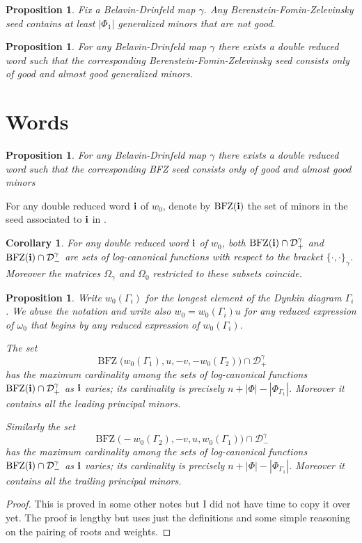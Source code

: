 \documentclass[a4paper]{amsart}
\newtheorem{proposition}[theorem]{Proposition}
\newtheorem{corollary}[theorem]{Corollary}
\theoremstyle{definition}
\begin{document}
\begin{proposition}
  Fix a Belavin-Drinfeld map $\gamma$. 
  Any Berenstein-Fomin-Zelevinsky seed contains at least $|\Phi_1|$ generalized minors that are not good.
\end{proposition}

\begin{proposition}
  For any Belavin-Drinfeld map $\gamma$ there exists a double reduced word such that the corresponding Berenstein-Fomin-Zelevinsky seed consists only of good and almost good generalized minors.
\end{proposition}


\section{Words}
\begin{proposition}
  For any Belavin-Drinfeld map $\gamma$ there exists a double reduced word such that the corresponding BFZ seed consists only of good and almost good minors
\end{proposition}


For any double reduced word $\bf{i}$ of $w_0$, denote by $\operatorname{BFZ}(\bf{i})$ the set of minors in the seed associated to $\bf{i}$ in \cite{BFZ05}.

\begin{corollary}
  For any double reduced word $\bf{i}$ of $w_0$, both  $\operatorname{BFZ}(\bf{i})\cap\mathcal{D}^\gamma_+$ and $\operatorname{BFZ}(\bf{i})\cap\mathcal{D}^\gamma_-$ are sets of log-canonical functions with respect to the bracket $\{\cdot,\cdot\}_\gamma$.
  Moreover the matrices $\Omega_\gamma$ and $\Omega_0$ restricted to these subsets coincide.
\end{corollary}

\begin{proposition}
  Write $w_0(\Gamma_i)$ for the longest element of the Dynkin diagram $\Gamma_i$.
  We abuse the notation and write also $w_0=w_0(\Gamma_i)u$ for any reduced expression of $\omega_0$ that begins by any reduced expression of $w_0(\Gamma_i)$.

  The set
  \[
    \operatorname{BFZ}\big(w_0(\Gamma_1),u,-v,-w_0(\Gamma_2)\big)\cap\mathcal{D}^\gamma_+
  \]
  has the maximum cardinality among the sets of log-canonical functions $\operatorname{BFZ}(\bf{i})\cap\mathcal{D}^\gamma_+$ as $\bf{i}$ varies; its cardinality is precisely $n+|\Phi|-|\Phi_{\Gamma_1}|$. 
  Moreover it contains all the leading principal minors.

  Similarly the set
  \[
    \operatorname{BFZ}\big(-w_0(\Gamma_2),-v,u,w_0(\Gamma_1)\big)\cap\mathcal{D}^\gamma_-
  \]
  has the maximum cardinality among the sets of log-canonical functions $\operatorname{BFZ}(\bf{i})\cap\mathcal{D}^\gamma_-$ as $\bf{i}$ varies; its cardinality is precisely $n+|\Phi|-|\Phi_{\Gamma_1}|$. 
  Moreover it contains all the trailing principal minors.
\end{proposition}
\begin{proof}
  This is proved in some other notes but I did not have time to copy it over yet.
  The proof is lengthy but uses just the definitions and some simple reasoning on the pairing of roots and weights.
\end{proof}
\end{document}
